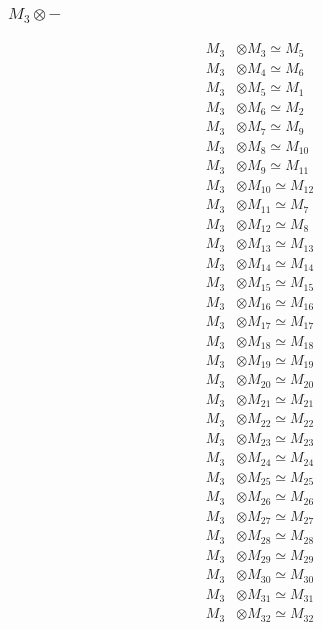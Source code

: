 \subsubsection{$ M_{3}\otimes -$}
\begin{align*}
M_{3} &\otimes M_{3} \simeq M_{5} \\
M_{3} &\otimes M_{4} \simeq M_{6} \\
M_{3} &\otimes M_{5} \simeq M_{1} \\
M_{3} &\otimes M_{6} \simeq M_{2} \\
M_{3} &\otimes M_{7} \simeq M_{9} \\
M_{3} &\otimes M_{8} \simeq M_{10} \\
M_{3} &\otimes M_{9} \simeq M_{11} \\
M_{3} &\otimes M_{10} \simeq M_{12} \\
M_{3} &\otimes M_{11} \simeq M_{7} \\
M_{3} &\otimes M_{12} \simeq M_{8} \\
M_{3} &\otimes M_{13} \simeq M_{13} \\
M_{3} &\otimes M_{14} \simeq M_{14} \\
M_{3} &\otimes M_{15} \simeq M_{15} \\
M_{3} &\otimes M_{16} \simeq M_{16} \\
M_{3} &\otimes M_{17} \simeq M_{17} \\
M_{3} &\otimes M_{18} \simeq M_{18} \\
M_{3} &\otimes M_{19} \simeq M_{19} \\
M_{3} &\otimes M_{20} \simeq M_{20} \\
M_{3} &\otimes M_{21} \simeq M_{21} \\
M_{3} &\otimes M_{22} \simeq M_{22} \\
M_{3} &\otimes M_{23} \simeq M_{23} \\
M_{3} &\otimes M_{24} \simeq M_{24} \\
M_{3} &\otimes M_{25} \simeq M_{25} \\
M_{3} &\otimes M_{26} \simeq M_{26} \\
M_{3} &\otimes M_{27} \simeq M_{27} \\
M_{3} &\otimes M_{28} \simeq M_{28} \\
M_{3} &\otimes M_{29} \simeq M_{29} \\
M_{3} &\otimes M_{30} \simeq M_{30} \\
M_{3} &\otimes M_{31} \simeq M_{31} \\
M_{3} &\otimes M_{32} \simeq M_{32} \\

\end{align*}
